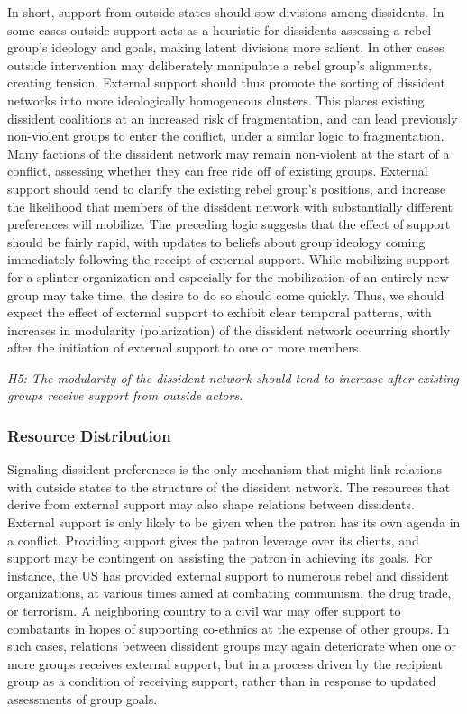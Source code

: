 In short, support from outside states should sow divisions among dissidents. In some cases outside support acts as a heuristic for dissidents assessing a rebel group's ideology and goals, making latent divisions more salient. In other cases outside intervention may deliberately manipulate a rebel group's alignments, creating tension. External support should thus promote the sorting of dissident networks into more ideologically homogeneous clusters. This places existing dissident coalitions at an increased risk of fragmentation, and can lead previously non-violent groups to enter the conflict, under a similar logic to fragmentation. Many factions of the dissident network may remain non-violent at the start of a conflict, assessing whether they can free ride off of existing groups. External support should tend to clarify the existing rebel group's positions, and increase the likelihood that members of the dissident network with substantially different preferences will mobilize. The preceding logic suggests that the effect of support should be fairly rapid, with updates to beliefs about group ideology coming immediately following the receipt of external support. While mobilizing support for a splinter organization and especially for the mobilization of an entirely new group may take time, the desire to do so should come quickly. Thus, we should expect the effect of external support to exhibit clear temporal patterns, with increases in modularity (polarization) of the dissident network occurring shortly after the initiation of external support to one or more members.

\noindent \textit{H5: The modularity of the dissident network should tend to increase after existing groups receive support from outside actors.}

\subsubsection{Resource Distribution}

Signaling dissident preferences is the only mechanism that might link relations with outside states to the structure of the dissident network. The resources that derive from external support may also shape relations between dissidents. External support is only likely to be given when the patron has its own agenda in a conflict. Providing support gives the patron leverage over its clients, and support may be contingent on assisting the patron in achieving its goals. For instance, the US has provided external support to numerous rebel and dissident organizations, at various times aimed at combating communism, the drug trade, or terrorism. A neighboring country to a civil war may offer support to combatants in hopes of supporting co-ethnics at the expense of other groups. In such cases, relations between dissident groups may again deteriorate when one or more groups receives external support, but in a process driven by the recipient group as a condition of receiving support, rather than in response to updated assessments of group goals.

